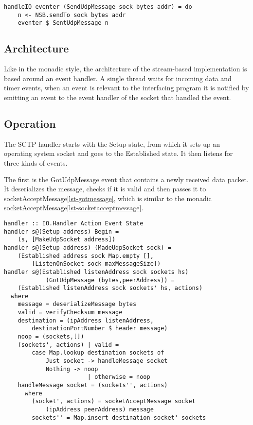 \begin{lstlisting}[caption={Example of an Action, SendUdpMessage}, label={lst-action}]
handleIO eventer (SendUdpMessage sock bytes addr) = do
    n <- NSB.sendTo sock bytes addr
    eventer $ SentUdpMessage n
\end{lstlisting}
\subsection{Architecture}
Like in the monadic style, the architecture of the stream-based implementation is based around an event handler. A single thread waits for incoming data and timer events, when an event is relevant to the interfacing program it is notified by emitting an event to the event handler of the socket that handled the event.

\subsection{Operation}
The SCTP handler starts with the Setup state, from which it sets up an operating system socket and goes to the Established state. It then listens for three kinds of events.

The first is the GotUdpMessage event that contains a newly received data packet. It deserializes the message, checks if it is valid and then passes it to socketAcceptMessage\ref{lst-gotmessage}, which is similar to the monadic socketAcceptMessage\ref{lst-socketacceptmessage}.

\begin{lstlisting}[caption={The GotUdpMessage event handler},label={lst-gotmessage}]
handler :: IO.Handler Action Event State
handler s@(Setup address) Begin =
    (s, [MakeUdpSocket address])
handler s@(Setup address) (MadeUdpSocket sock) =
    (Established address sock Map.empty [],
        [ListenOnSocket sock maxMessageSize])
handler s@(Established listenAddress sock sockets hs)
            (GotUdpMessage (bytes,peerAddress)) =
    (Established listenAddress sock sockets' hs, actions)
  where
    message = deserializeMessage bytes
    valid = verifyChecksum message
    destination = (ipAddress listenAddress,
        destinationPortNumber $ header message)
    noop = (sockets,[])
    (sockets', actions) | valid =
        case Map.lookup destination sockets of
            Just socket -> handleMessage socket
            Nothing -> noop
                        | otherwise = noop
    handleMessage socket = (sockets'', actions)
      where
        (socket', actions) = socketAcceptMessage socket
            (ipAddress peerAddress) message
        sockets'' = Map.insert destination socket' sockets
\end{lstlisting}

